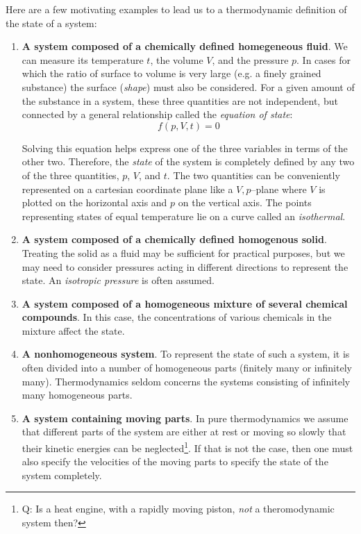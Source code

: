 \documentclass[11pt]{article}         %
\begin{document}
Here are a few motivating examples to lead us to a thermodynamic definition of the state of a system:
\begin{enumerate}
    \item \textbf{A system composed of a chemically defined homegeneous fluid}. We can measure its temperature $t$, the volume $V$, and the pressure $p$. In cases for which the ratio of surface to volume is very large (e.g. a finely grained substance) the surface (\emph{shape}) must also be considered. For a given amount of the substance in a system, these three quantities are not independent, but connected by a general relationship called the \emph{equation of state}: 
\begin{equation}
\label{eqn: pvt}
        f(p, V, t) = 0
\end{equation}

        Solving this equation helps express one of the three variables in terms of the other two. Therefore, the \emph{state} of the system is completely defined by any two of the three quantities, $p$, $V$, and $t$. The two quantities can be conveniently represented on a cartesian coordinate plane like a $V,p$--plane where $V$ is plotted on the horizontal axis and $p$ on the vertical axis. The points representing states of equal temperature lie on a curve called an \emph{isothermal}.
        
    \item \textbf{A system composed of a chemically defined homogenous solid}. Treating the solid as a fluid may be sufficient for practical purposes, but we may need to consider pressures acting in different directions to represent the state. An \emph{isotropic pressure} is often assumed.

    \item \textbf{A system composed of a homogeneous mixture of several chemical compounds}. In this case, the concentrations of various chemicals in the mixture affect the state.
        
    \item \textbf{A nonhomogeneous system}. To represent the state of such a system, it is often divided into a number of homogeneous parts (finitely many or infinitely many). Thermodynamics seldom concerns the systems consisting of infinitely many homogeneous parts.

    \item \textbf{A system containing moving parts}. In pure thermodynamics we assume that different parts of the system are either at rest or moving so slowly that their kinetic energies can be neglected\footnote{Q: Is a heat engine, with a rapidly moving piston, \emph{not} a theromodynamic system then?}. If that is not the case, then one must also specify the velocities of the moving parts to specify the state of the system completely.
\end{enumerate}
\end{document}
